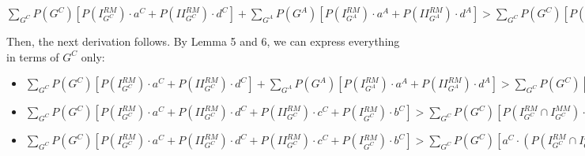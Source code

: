 \documentclass[fleqn,reqno,11pt]{article}
\begin{document}
\medskip{}

\noindent $\sum_{G^{C}}P(G^{C})[P(I_{G^{C}}^{RM})\cdot a^{C}+P(II_{G^{C}}^{RM})\cdot d^{C}]+\sum_{G^{A}}P(G^{A})[P(I_{G^{A}}^{RM})\cdot a^{A}+P(II_{G^{A}}^{RM})\cdot d^{A}]>\sum_{G^{C}}P(G^{C})[P(I_{G^{C}}^{RM}\cap I_{G^{C}}^{MM})\cdot a^{C}+P(II_{G^{C}}^{RM}\cap II_{G^{C}}^{MM})\cdot d^{C}+P(I_{G^{C}}^{RM}\cap II_{G^{C}}^{MM})\cdot c^{C}+P(II_{G^{C}}^{RM}\cap I_{G^{C}}^{MM})\cdot b^{C}]+\sum_{G^{A}}P(G^{A})[P(I_{G^{A}}^{RM}\cap I_{G^{A}}^{MM})\cdot a^{A}+P(II_{G^{A}}^{RM}\cap II_{G^{A}}^{MM})\cdot d^{A}+P(I_{G^{A}}^{RM}\cap II_{G^{A}}^{MM})\cdot c^{A}+P(II_{G^{A}}^{RM}\cap I_{G^{A}}^{MM})\cdot b^{A}]$
\medskip{}

\noindent Then, the next derivation follows. By Lemma 5 and 6, we can express
everything in terms of $G^{C}$ only: 
\begin{itemize}
\item $\sum_{G^{C}}P(G^{C})[P(I_{G^{C}}^{RM})\cdot a^{C}+P(II_{G^{C}}^{RM})\cdot d^{C}]+\sum_{G^{A}}P(G^{A})[P(I_{G^{A}}^{RM})\cdot a^{A}+P(II_{G^{A}}^{RM})\cdot d^{A}]>\sum_{G^{C}}P(G^{C})[P(I_{G^{C}}^{RM}\cap I_{G^{C}}^{MM})\cdot a^{C}+P(II_{G^{C}}^{RM}\cap II_{G^{C}}^{MM})\cdot d^{C}+P(I_{G^{C}}^{RM}\cap II_{G^{C}}^{MM})\cdot c^{C}+P(II_{G^{C}}^{RM}\cap I_{G^{C}}^{MM})\cdot b^{C}]+\sum_{G^{A}}P(G^{A})[P(I_{G^{A}}^{RM}\cap I_{G^{A}}^{MM})\cdot a^{A}+P(II_{G^{A}}^{RM}\cap II_{G^{A}}^{MM})\cdot d^{A}+P(I_{G^{A}}^{RM}\cap II_{G^{A}}^{MM})\cdot c^{A}+P(II_{G^{A}}^{RM}\cap I_{G^{A}}^{MM})\cdot b^{A}]$
\item $\sum_{G^{C}}P(G^{C})[P(I_{G^{C}}^{RM})\cdot a^{C}+P(II_{G^{C}}^{RM})\cdot d^{C}+P(II_{G^{C}}^{RM})\cdot c^{C}+P(I{}_{G^{C}}^{RM})\cdot b^{C}]>\sum_{G^{C}}P(G^{C})[P(I_{G^{C}}^{RM}\cap I_{G^{C}}^{MM})\cdot a^{C}+P(II_{G^{C}}^{RM}\cap II_{G^{C}}^{MM})\cdot d^{C}+P(I_{G^{C}}^{RM}\cap II_{G^{C}}^{MM})\cdot c^{C}+P(II_{G^{C}}^{RM}\cap I_{G^{C}}^{MM})\cdot b^{C}+P(II_{G^{C}}^{RM}\cap II_{G^{C}}^{MM})\cdot c^{C}+P(I_{G^{C}}^{RM}\cap I_{G^{C}}^{MM})\cdot b^{C}+P(II_{G^{C}}^{RM}\cap I_{G^{C}}^{MM})\cdot a^{C}+P(I_{G^{C}}^{RM}\cap II_{G^{C}}^{MM})\cdot d^{C}]$
\item $\sum_{G^{C}}P(G^{C})[P(I_{G^{C}}^{RM})\cdot a^{C}+P(II_{G^{C}}^{RM})\cdot d^{C}+P(II_{G^{C}}^{RM})\cdot c^{C}+P(I{}_{G^{C}}^{RM})\cdot b^{C}]>\sum_{G^{C}}P(G^{C})[a^{C}\cdot(P(I_{G^{C}}^{RM}\cap I_{G^{C}}^{MM})+P(II_{G^{C}}^{RM}\cap I_{G^{C}}^{MM}))+b^{C}\cdot(P(II_{G^{C}}^{RM}\cap I_{G^{C}}^{MM})+P(I_{G^{C}}^{RM}\cap I_{G^{C}}^{MM}))+c^{C}\cdot(P(I_{G^{C}}^{RM}\cap II_{G^{C}}^{MM})+P(II_{G^{C}}^{RM}\cap II_{G^{C}}^{MM}))+d^{C}\cdot(P(II_{G^{C}}^{RM}\cap II_{G^{C}}^{MM})+P(I_{G^{C}}^{RM}\cap II_{G^{C}}^{MM}))]$
\end{itemize}
\end{document}
